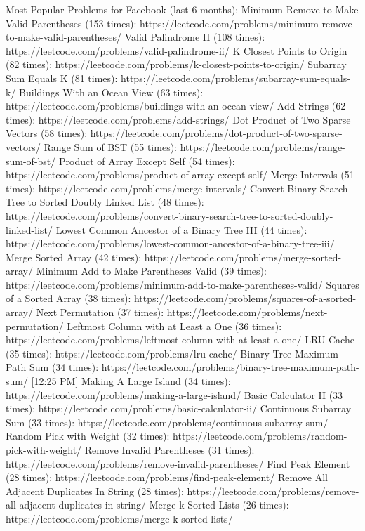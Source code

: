 Most Popular Problems for Facebook (last 6 months):
Minimum Remove to Make Valid Parentheses (153 times): https://leetcode.com/problems/minimum-remove-to-make-valid-parentheses/
Valid Palindrome II (108 times): https://leetcode.com/problems/valid-palindrome-ii/
K Closest Points to Origin (82 times): https://leetcode.com/problems/k-closest-points-to-origin/
Subarray Sum Equals K (81 times): https://leetcode.com/problems/subarray-sum-equals-k/
Buildings With an Ocean View (63 times): https://leetcode.com/problems/buildings-with-an-ocean-view/
Add Strings (62 times): https://leetcode.com/problems/add-strings/
Dot Product of Two Sparse Vectors (58 times): https://leetcode.com/problems/dot-product-of-two-sparse-vectors/
Range Sum of BST (55 times): https://leetcode.com/problems/range-sum-of-bst/
Product of Array Except Self (54 times): https://leetcode.com/problems/product-of-array-except-self/
Merge Intervals (51 times): https://leetcode.com/problems/merge-intervals/
Convert Binary Search Tree to Sorted Doubly Linked List (48 times): https://leetcode.com/problems/convert-binary-search-tree-to-sorted-doubly-linked-list/
Lowest Common Ancestor of a Binary Tree III (44 times): https://leetcode.com/problems/lowest-common-ancestor-of-a-binary-tree-iii/
Merge Sorted Array (42 times): https://leetcode.com/problems/merge-sorted-array/
Minimum Add to Make Parentheses Valid (39 times): https://leetcode.com/problems/minimum-add-to-make-parentheses-valid/
Squares of a Sorted Array (38 times): https://leetcode.com/problems/squares-of-a-sorted-array/
Next Permutation (37 times): https://leetcode.com/problems/next-permutation/
Leftmost Column with at Least a One (36 times): https://leetcode.com/problems/leftmost-column-with-at-least-a-one/
LRU Cache (35 times): https://leetcode.com/problems/lru-cache/
Binary Tree Maximum Path Sum (34 times): https://leetcode.com/problems/binary-tree-maximum-path-sum/
[12:25 PM]
Making A Large Island (34 times): https://leetcode.com/problems/making-a-large-island/
Basic Calculator II (33 times): https://leetcode.com/problems/basic-calculator-ii/
Continuous Subarray Sum (33 times): https://leetcode.com/problems/continuous-subarray-sum/
Random Pick with Weight (32 times): https://leetcode.com/problems/random-pick-with-weight/
Remove Invalid Parentheses (31 times): https://leetcode.com/problems/remove-invalid-parentheses/
Find Peak Element (28 times): https://leetcode.com/problems/find-peak-element/
Remove All Adjacent Duplicates In String (28 times): https://leetcode.com/problems/remove-all-adjacent-duplicates-in-string/
Merge k Sorted Lists (26 times): https://leetcode.com/problems/merge-k-sorted-lists/
